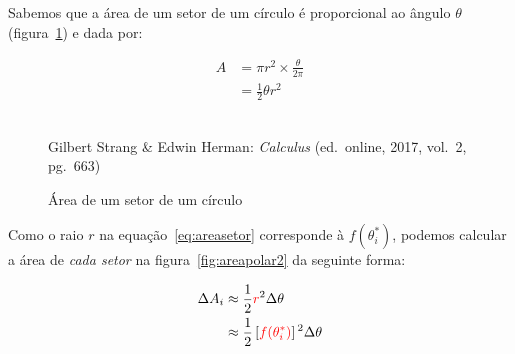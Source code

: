 Sabemos que a área de um setor de um círculo é proporcional ao
ângulo $\theta$ (figura~\ref{fig:areapolar3}) e dada por:

\begin{equation}
  \label{eq:areasetor}
  \begin{split}
    A &= \pi r^2 \times \frac{\theta}{2\pi}\\
    &= \frac{1}{2}\theta r^2
  \end{split}
\end{equation}

\begin{figure}[H]
  \begin{center}
    \caption{Área de um setor de um círculo}
    \label{fig:areapolar3}
    \\
    \footnotesize{Gilbert Strang \& Edwin Herman: \emph{Calculus}
          (ed.\ online, 2017, vol.\ 2, pg.\ 663)}
    \end{center}
\end{figure}

Como o raio $r$ na equação~\ref{eq:areasetor} corresponde à
$f(\theta^*_i)$, podemos calcular a área de \emph{cada
setor} na figura~\ref{fig:areapolar2} da seguinte forma:

\begin{equation}
  \begin{split}
    \Delta A_i &\approx \frac{1}{2}\color{red}r\color{black}^2 \Delta \theta\\
        &\approx \frac{1}{2}\left[\color{red}f(\theta_i^*)\color{black}\right]^2 \Delta \theta
  \end{split}
\end{equation}

